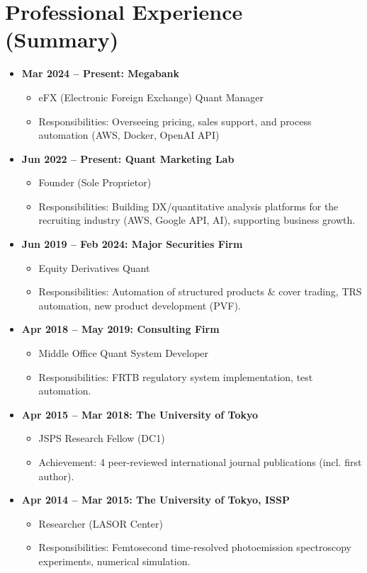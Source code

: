 \documentclass[uplatex,a4j,10.5pt,dvipdfmx]{jsarticle}
\begin{document}
\section*{Professional Experience (Summary)}
\begin{itemize}[leftmargin=*]
    \item \textbf{Mar 2024 -- Present: Megabank}
        \begin{itemize}
            \item eFX (Electronic Foreign Exchange) Quant Manager
            \item Responsibilities: Overseeing pricing, sales support, and process automation (AWS, Docker, OpenAI API)
        \end{itemize}
    \item \textbf{Jun 2022 -- Present: Quant Marketing Lab}
        \begin{itemize}
            \item Founder (Sole Proprietor)
            \item Responsibilities: Building DX/quantitative analysis platforms for the recruiting industry (AWS, Google API, AI), supporting business growth.
        \end{itemize}
    \item \textbf{Jun 2019 -- Feb 2024: Major Securities Firm}
        \begin{itemize}
            \item Equity Derivatives Quant
            \item Responsibilities: Automation of structured products \& cover trading, TRS automation, new product development (PVF).
        \end{itemize}
    \item \textbf{Apr 2018 -- May 2019: Consulting Firm}
        \begin{itemize}
            \item Middle Office Quant System Developer
            \item Responsibilities: FRTB regulatory system implementation, test automation.
        \end{itemize}
    \item \textbf{Apr 2015 -- Mar 2018: The University of Tokyo}
        \begin{itemize}
            \item JSPS Research Fellow (DC1)
            \item Achievement: 4 peer-reviewed international journal publications (incl. first author).
        \end{itemize}
    \item \textbf{Apr 2014 -- Mar 2015: The University of Tokyo, ISSP}
        \begin{itemize}
            \item Researcher (LASOR Center)
            \item Responsibilities: Femtosecond time-resolved photoemission spectroscopy experiments, numerical simulation.
        \end{itemize}
\end{itemize}
\end{document}
